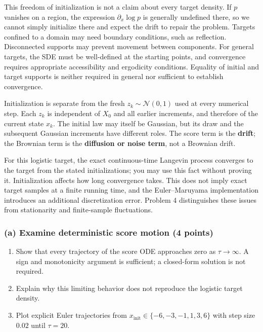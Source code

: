 \documentclass[11pt,a4paper]{article}
\providecommand{\tightlist}{\setlength{\itemsep}{0pt}\setlength{\parskip}{0pt}}
\begin{document}
This freedom of initialization is not a claim about every target
density. If \(p\) vanishes on a region, the expression
\(\partial_x\log p\) is generally undefined there, so we cannot simply
initialize there and expect the drift to repair the problem. Targets
confined to a domain may need boundary conditions, such as reflection.
Disconnected supports may prevent movement between components. For
general targets, the SDE must be well-defined at the starting points,
and convergence requires appropriate accessibility and ergodicity
conditions. Equality of initial and target supports is neither required
in general nor sufficient to establish convergence.

Initialization is separate from the fresh \(z_k\sim\mathcal N(0,1)\)
used at every numerical step. Each \(z_k\) is independent of \(X_0\) and
all earlier increments, and therefore of the current state \(x_k\). The
initial law may itself be Gaussian, but its draw and the subsequent
Gaussian increments have different roles. The score term is the
\textbf{drift}; the Brownian term is the \textbf{diffusion or noise
term}, not a Brownian drift.

For this logistic target, the exact continuous-time Langevin process
converges to the target from the stated initializations; you may use
this fact without proving it. Initialization affects how long
convergence takes. This does not imply exact target samples at a finite
running time, and the Euler--Maruyama implementation introduces an
additional discretization error. Problem 4 distinguishes these issues
from stationarity and finite-sample fluctuations.

\subsubsection{(a) Examine deterministic score motion (4
points)}\label{a-examine-deterministic-score-motion-4-points}

\begin{enumerate}
\def\labelenumi{\arabic{enumi}.}
\tightlist
\item
  Show that every trajectory of the score ODE approaches zero as
  \(\tau\to\infty\). A sign and monotonicity argument is sufficient; a
  closed-form solution is not required.
\item
  Explain why this limiting behavior does not reproduce the logistic
  target density.
\item
  Plot explicit Euler trajectories from
  \(x_{\mathrm{init}}\in\{-6,-3,-1,1,3,6\}\) with step size \(0.02\)
  until \(\tau=20\).
\end{enumerate}
\end{document}
